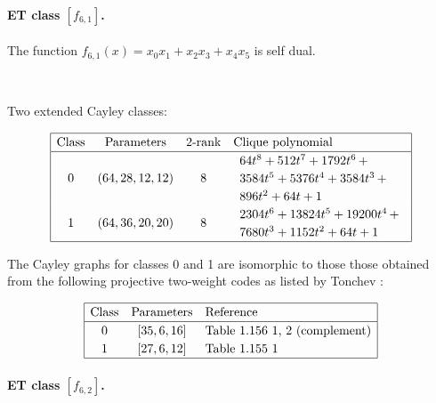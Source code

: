 \documentclass[12pt,a4paper]{article}
\begin{document}
\paragraph*{ET class $[f_{6,1}]$.}

The function
$f_{6,1}(x) = x_0 x_1 + x_2 x_3 + x_4 x_5$ is self dual.

~

Two extended Cayley classes:

\small{}
\begin{align*}
\def\arraystretch{1.2}
\begin{array}{|cccl|}
\hline
\text{Class} &
\text{Parameters} &
\text{2-rank} &
\text{Clique polynomial}
\\
\hline
0 &
(64, 28, 12, 12) &
8 &
\begin{array}{l}
64t^{8} + 512t^{7} + 1792t^{6}
\,+
\\
 3584t^{5} + 5376t^{4} + 3584t^{3}
\,+
\\
 896t^{2} + 64t + 1
\end{array}
\\
1 &
(64, 36, 20, 20) &
8 &
\begin{array}{l}
2304t^{6} + 13824t^{5} + 19200t^{4}
\,+
\\
 7680t^{3} + 1152t^{2} + 64t + 1
\end{array}
\\
\hline
\end{array}
\end{align*}

The Cayley graphs for classes 0 and 1 are isomorphic to those those obtained from the following
projective two-weight
codes as listed by Tonchev \cite{Ton07codes}:

\begin{align*}
\def\arraystretch{1.2}
\begin{array}{|ccl|}
\hline
\text{Class} &
\text{Parameters} & \text{Reference}
\\
\hline
0 & [35,6,16] & \text{Table 1.156 1, 2 (complement)}
\\
1 & [27,6,12] & \text{Table 1.155 1 }
\\
\hline
\end{array}
\end{align*}

\paragraph*{ET class $[f_{6,2}]$.}
\end{document}
